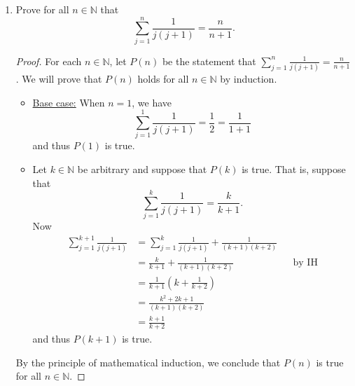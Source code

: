 \documentclass[11pt]{article}
\def\naturals{\mathbb{N}}
\begin{document}
\begin{enumerate}
\item Prove for all $n\in\naturals$ that
\[
 \sum_{j=1}^n \frac{1}{j(j+1)} = \frac{n}{n+1}.
\]
\begin{Solution}
 \begin{proof}
For each $n\in\naturals$, let $P(n)$ be the statement that $\sum_{j=1}^n \frac{1}{j(j+1)} = \frac{n}{n+1}$. We will prove that $P(n)$ holds for all $n\in\naturals$ by induction.
\begin{itemize}
 \item \underline{Base case:} When $n=1$, we have
 \[
  \sum_{j=1}^1 \frac{1}{j(j+1)} = \frac{1}{2} = \frac{1}{1+1}
 \]
and thus $P(1)$ is true.
\item \underline{} Let $k\in\naturals$ be arbitrary and suppose that $P(k)$ is true. That is, suppose that
\[
 \sum_{j=1}^k \frac{1}{j(j+1)} = \frac{k}{k+1}.\tag{Induction Hypothesis}
\]
Now
\begin{align*}
 \sum_{j=1}^{k+1} \frac{1}{j(j+1)}
 &= \sum_{j=1}^{k} \frac{1}{j(j+1)} + \frac{1}{(k+1)(k+2)}\\
 & = \frac{k}{k+1} + \frac{1}{(k+1)(k+2)} && \text{by IH}\\
 & = \frac{1}{k+1}\left(k + \frac{1}{k+2}\right) \\
 & = \frac{k^2+2k+1}{(k+1)(k+2)} \\
 & = \frac{k+1}{k+2}
\end{align*}
and thus $P(k+1)$ is true.
\end{itemize}
By the principle of mathematical induction, we conclude that $P(n)$ is true for all $n\in\naturals$. 
 \end{proof}
\end{Solution}




\end{enumerate}
\end{document}
